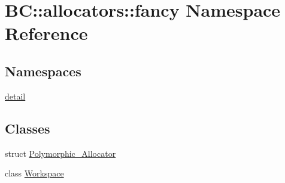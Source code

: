 \hypertarget{namespaceBC_1_1allocators_1_1fancy}{}\section{BC\+:\+:allocators\+:\+:fancy Namespace Reference}
\label{namespaceBC_1_1allocators_1_1fancy}
\subsection*{Namespaces}
\begin{DoxyCompactItemize}
\item 
 \hyperlink{namespaceBC_1_1allocators_1_1fancy_1_1detail}{detail}
\end{DoxyCompactItemize}
\subsection*{Classes}
\begin{DoxyCompactItemize}
\item 
struct \hyperlink{structBC_1_1allocators_1_1fancy_1_1Polymorphic__Allocator}{Polymorphic\+\_\+\+Allocator}
\item 
class \hyperlink{classBC_1_1allocators_1_1fancy_1_1Workspace}{Workspace}
\end{DoxyCompactItemize}

